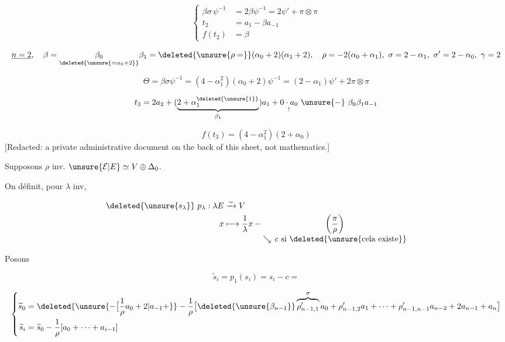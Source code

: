 \[
\left\{\begin{aligned}
\beta\sigma\,\psi^{-1}&=2\beta\psi^{-1}=2\psi'+\pi\otimes\pi\\
t_2&=a_1-\beta a_{-1}\\
f(t_2)&=\beta
\end{aligned}\right.
\]

\[
\underline{n=2},\quad
\beta=\underset{\deleted{\unsure{=\alpha_0+2}}}{\beta_0}\beta_1
=\deleted{\unsure{\rho=}}(\alpha_0+2)(\alpha_1+2),\quad
\rho=-2(\alpha_0+\alpha_1),\ \sigma=2-\alpha_1,\ \sigma'=2-\alpha_0,\ \gamma=2
\]

\[
\Theta=\beta\sigma\psi^{-1}=(4-\alpha_1^2)(\alpha_0+2)\psi^{-1}
=(2-\alpha_1)\psi'+2\pi\otimes\pi
\]

\[
t_3=2a_2+(\underbrace{2+\alpha_1^{\deleted{\unsure{1}}}}_{\beta_1})a_1+
 \underset{!}{0\cdot a_0}\ \unsure{-}\ \beta_0\beta_1a_{-1}
\]

\[
f(t_3)=(4-\alpha_1^2)(2+\alpha_0)
\]
[Redacted: a private administrative document on the back of this sheet, not mathematics.]


Supposons $\rho$ inv.  \qquad $\unsure{\mathcal E|E}\simeq V\oplus\Delta_0$.

On définit, pour $\lambda$ inv,

\[
\begin{aligned}
\deleted{\unsure{s_{\lambda}}}\ p_\lambda:\lambda E&\xrightarrow{\sim}V\\
x&\longmapsto \frac1\lambda x-\underset{\displaystyle\searrow\,c\ \text{si \deleted{\unsure{cela existe}}}}{\left(\frac{\pi}{\rho}\right)}
\end{aligned}
\]

Posons

\[
\widetilde{s}_i=p_1(s_i)=s_i-c=
\]

\[
\left\{\begin{aligned}
\widetilde{s}_0&=\deleted{\unsure{-\bigl[\frac{1}{\rho}a_0+2|a_{-1}+}}
-\frac1{\rho}\bigl[\deleted{\unsure{\beta_{n-1}}}
 \overbrace{\rho'_{n-1,1}}^{\sigma}a_0+\rho'_{n-1,2}a_1+
 \cdots+\rho'_{n-1,n-1}a_{n-2}+2a_{n-1}+a_n\bigr]\\
\widetilde{s}_i&=\widetilde{s}_0-\frac1{\rho}[a_0+\cdots+a_{i-1}]
\end{aligned}\right.
\]

